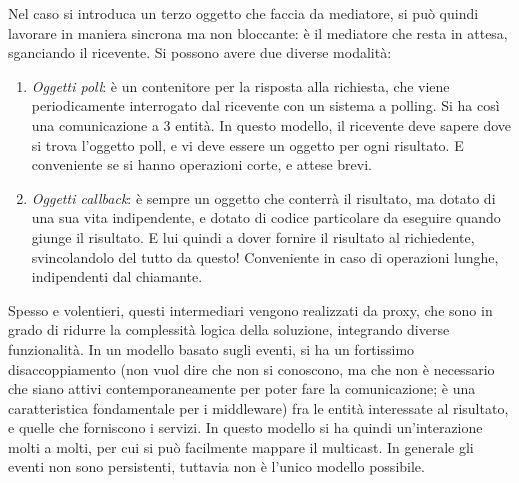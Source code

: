 Nel caso si introduca un terzo oggetto che faccia da mediatore, si può quindi lavorare in maniera sincrona ma non
bloccante: è il mediatore che resta in attesa, sganciando il ricevente. Si possono avere due diverse modalità:
\begin{enumerate}
 \item \textit{Oggetti poll}: è un contenitore per la risposta alla richiesta, che viene periodicamente interrogato 
 dal ricevente con un sistema a polling. Si ha così una comunicazione a 3 entità. In questo modello, il ricevente 
 deve sapere dove si trova l'oggetto poll, e vi deve essere un oggetto per ogni risultato. E conveniente se si hanno
 operazioni corte, e attese brevi.
 \item \textit{Oggetti callback}: è sempre un oggetto che conterrà il risultato, ma dotato di una sua vita 
 indipendente, e dotato di codice particolare da eseguire quando giunge il risultato. E lui quindi a dover fornire il
 risultato al richiedente, svincolandolo del tutto da questo! Conveniente in caso di operazioni lunghe, indipendenti 
 dal chiamante.
\end{enumerate}
Spesso e volentieri, questi intermediari vengono realizzati da proxy, che sono in grado di ridurre la complessità 
logica della soluzione, integrando diverse funzionalità. 
In un modello basato sugli eventi, si ha un fortissimo disaccoppiamento (non vuol dire che non si conoscono, ma che 
non è necessario che siano attivi contemporaneamente per poter fare la comunicazione; è una caratteristica 
fondamentale per i middleware) fra le entità interessate al risultato, e quelle che forniscono i servizi. In questo
modello si ha quindi un'interazione molti a molti, per cui si può facilmente mappare il multicast. In generale gli
eventi non sono persistenti, tuttavia non è l'unico modello possibile.
